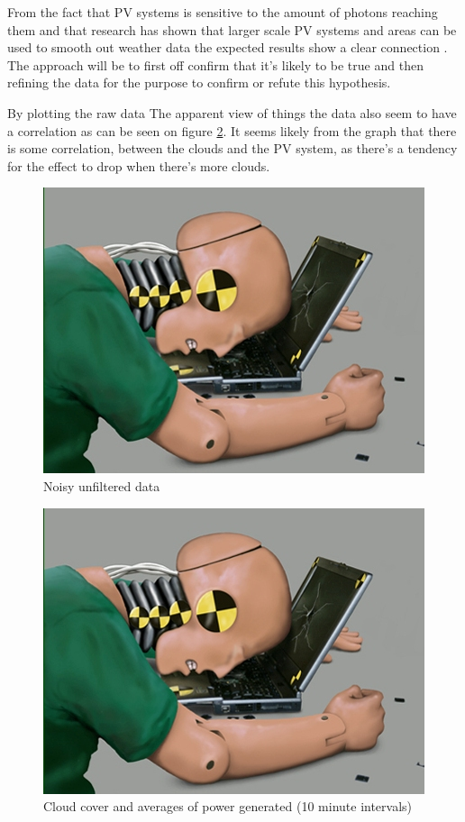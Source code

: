 From the fact that PV systems is sensitive to the amount of photons
reaching them and that research has shown that larger scale PV systems
and areas can be used to smooth out weather data the expected results
show a clear connection \citep{southafrica, cloudTrack, photovoltaic}.
The approach will be to first off confirm that it's likely to be true
and then refining the data for the purpose to confirm or refute this
hypothesis.

By plotting the raw data
The apparent view of things the data also seem to have a correlation
as can be seen on figure \ref{fig:cloudsAndPower}.  It seems likely
from the graph that there is some correlation, between the clouds and
the PV system, as there's a tendency for the effect to drop when
there's more clouds.

\begin{figure}
  \centering
  \includegraphics{dummy.jpg}
  \caption{Noisy unfiltered data}
  \label{fig:noise}
\end{figure}

\begin{figure}
  \centering
  \includegraphics{dummy.jpg}
  \caption{Cloud cover and averages of power generated (10 minute
    intervals)}
  \label{fig:cloudsAndPower}
\end{figure}

